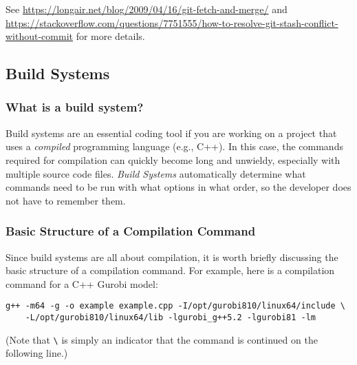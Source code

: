 \documentclass[12pt]{article}
\begin{document}
See \url{https://longair.net/blog/2009/04/16/git-fetch-and-merge/} and \url{https://stackoverflow.com/questions/7751555/how-to-resolve-git-stash-conflict-without-commit} for more details.

\subsection{Build Systems}
\subsubsection{What is a build system?}
Build systems are an essential coding tool if you are working on a project that uses a \emph{compiled} programming language (e.g., C++). In this case, the commands required for compilation can quickly become long and unwieldy, especially with multiple source code files. \emph{Build Systems} automatically determine what commands need to be run with what options in what order, so the developer does not have to remember them.

\subsubsection{Basic Structure of a Compilation Command}
Since build systems are all about compilation, it is worth briefly discussing the basic structure of a compilation command. For example, here is a compilation command for a C++ Gurobi model:
\begin{verbatim}
g++ -m64 -g -o example example.cpp -I/opt/gurobi810/linux64/include \
    -L/opt/gurobi810/linux64/lib -lgurobi_g++5.2 -lgurobi81 -lm
\end{verbatim}
(Note that \verb+\+ is simply an indicator that the command is continued on the following line.)
\end{document}
